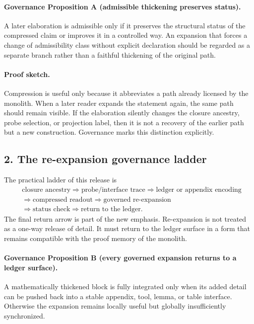 \paragraph{Governance Proposition A (admissible thickening preserves status).}
A later elaboration is admissible only if it preserves the structural status of
the compressed claim or improves it in a controlled way. An expansion that
forces a change of admissibility class without explicit declaration should be
regarded as a separate branch rather than a faithful thickening of the original
path.

\paragraph{Proof sketch.}
Compression is useful only because it abbreviates a path already licensed by the
monolith. When a later reader expands the statement again, the same path should
remain visible. If the elaboration silently changes the closure ancestry, probe
selection, or projection label, then it is not a recovery of the earlier path
but a new construction. Governance marks this distinction explicitly.

\subsection*{2. The re-expansion governance ladder}
The practical ladder of this release is
\[
\begin{aligned}
&\text{closure ancestry} \Longrightarrow \text{probe/interface trace} \Longrightarrow \text{ledger or appendix encoding}\\
&\Longrightarrow \text{compressed readout} \Longrightarrow \text{governed re-expansion}\\
&\Longrightarrow \text{status check} \Longrightarrow \text{return to the ledger}.
\end{aligned}
\]
The final return arrow is part of the new emphasis. Re-expansion is not treated
as a one-way release of detail. It must return to the ledger surface in a form
that remains compatible with the proof memory of the monolith.

\paragraph{Governance Proposition B (every governed expansion returns to a ledger surface).}
A mathematically thickened block is fully integrated only when its added detail
can be pushed back into a stable appendix, tool, lemma, or table interface.
Otherwise the expansion remains locally useful but globally insufficiently
synchronized.

